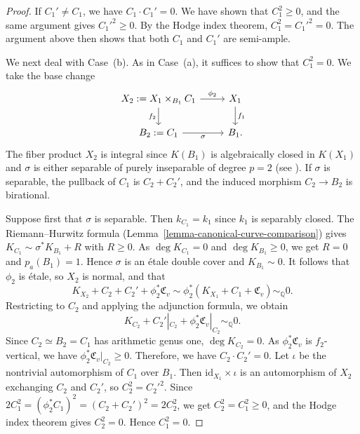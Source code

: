 \documentclass[10pt,abstract=true]{scrartcl}
\numberwithin{equation}{section}
\theoremstyle{definition}
\theoremstyle{remark}
\def\simQ{\sim_{\mathbb Q}} \def\geQ{\ge_{\mathbb Q}}
\begin{document}
\begin{proof}
  If $C_1'\neq C_1$, we have $C_1\cdot C_1'=0$.
  We have shown that $C_1^2\geq0$, and the same argument gives $C_1'^2\geq0$.
  By the Hodge index theorem, $C_1^2=C_1'^2=0$.
  The argument above then shows that both $C_1$ and $C_1'$ are semi-ample.
  
  \smallskip
  We next deal with Case~(b).
  As in Case~(a), it suffices to show that $C_1^2=0$.
  We take the base change
  \begin{equation}\label{eq:KN13}
    \begin{tikzcd}
      X_2:=X_1\times_{B_1}C_1 \ar[r,"\phi_2"] \ar[d,"f_2"']
        & X_1 \ar[d,"f_1"]\\
      B_2:=C_1 \ar[r,"\sigma"'] & B_1.
    \end{tikzcd}
  \end{equation}
  The fiber product $X_2$ is integral since $K(B_1)$ is algebraically closed in $K(X_1)$ and $\sigma$ is either separable of purely inseparable of degree $p=2$ (see \cite[Lemma~3.3]{tanaka_behavior_2018}).
  If $\sigma$ is separable, the pullback of $C_1$ is $C_2+C_2'$, and the induced morphism $C_2\to B_2$ is birational.

  Suppose first that $\sigma$ is separable.
  Then $k_{C_1}=k_1$ since $k_1$ is separably closed.
  The Riemann--Hurwitz formula (Lemma~\ref{lemma-canonical-curve-comparison}) gives $K_{C_1}\sim\sigma^*K_{B_1}+R$ with $R\geq0$.
  As $\deg K_{C_1}=0$ and $\deg K_{B_1}\geq0$, we get $R=0$ and $p_a(B_1)=1$.
  Hence $\sigma$ is an \'etale double cover and $K_{B_1}\sim0$.
  It follows that $\phi_2$ is \'etale, so $X_2$ is normal, and that
    \[
      K_{X_2}+C_2+C_2'+\phi_2^*\mathfrak C_v\sim\phi_2^*(K_{X_1}+C_1+\mathfrak C_v)\simQ0.
    \]
  Restricting to $C_2$ and applying the adjunction formula, we obtain \[
    K_{C_2}+C_2'|_{C_2}+\phi_2^*\mathfrak C_v|_{C_2}\simQ0.
  \]
  Since $C_2\simeq B_2=C_1$ has arithmetic genus one, $\deg K_{C_2}=0$. As $\phi_2^*\mathfrak C_v$ is $f_2$-vertical, we have $\phi_2^*\mathfrak C_v|_{C_2}\ge 0$. 
  Therefore, we have $C_2\cdot C_2'=0$.
  Let $\iota$ be the nontrivial automorphism of $C_1$ over $B_1$.
  Then $\mathrm{id}_{X_1}\times\iota$ is an automorphism of $X_2$ exchanging $C_2$ and $C_2'$, so $C_2^2=C_2'^2$.
  Since $2C_1^2=(\phi_2^*C_1)^2=(C_2+C_2')^2=2C_2^2$, we get $C_2^2=C_1^2\geq0$, and the Hodge index theorem gives $C_2^2=0$.
  Hence $C_1^2=0$.


\end{proof}
\end{document}

